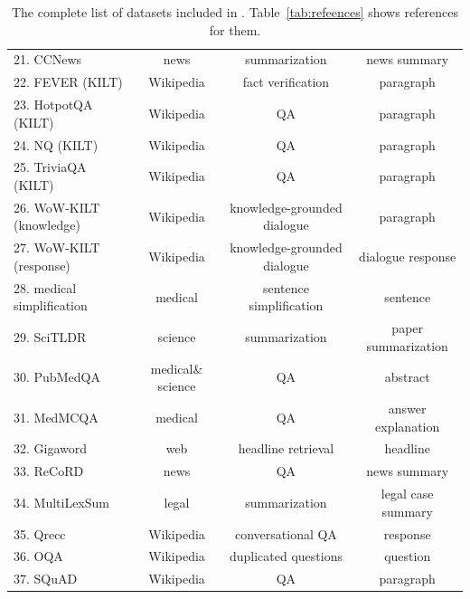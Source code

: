 \begin{table}[ht!]
\begin{tabular}{l   c  c  c}
21. CCNews &  news & summarization & news summary  \\
22. FEVER  (KILT) &  Wikipedia & fact verification & paragraph  \\
23. HotpotQA  (KILT) &  Wikipedia & QA & paragraph  \\
24. NQ  (KILT) &  Wikipedia & QA & paragraph  \\
25. TriviaQA (KILT) &  Wikipedia & QA & paragraph  \\
26. WoW-KILT (knowledge) &  Wikipedia & knowledge-grounded dialogue & paragraph  \\
27. WoW-KILT (response) &  Wikipedia & knowledge-grounded dialogue & dialogue response  \\
28. medical simplification &  medical & sentence simplification & sentence  \\
29. SciTLDR &  science & summarization & paper summarization  \\
30. PubMedQA &  medical\& science & QA & abstract \\
31. MedMCQA &  medical & QA & answer explanation \\
32. Gigaword &  web & headline retrieval & headline \\
33. ReCoRD &  news &QA & news summary \\
34. MultiLexSum &  legal & summarization & legal case summary \\
35. Qrecc & Wikipedia & conversational QA & response \\
36. OQA & Wikipedia & duplicated questions & question \\
37. SQuAD & Wikipedia & QA & paragraph \\
\bottomrule
\end{tabular}
\caption{The complete list of datasets included in \rib.  Table~\ref{tab:refeences} shows references for them.
}
\label{tab:list_of_datasets}
\end{table}
